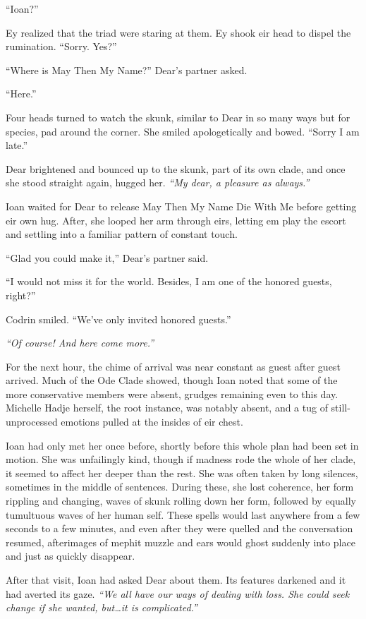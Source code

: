 ``Ioan?''

Ey realized that the triad were staring at them. Ey shook eir head to dispel the rumination. ``Sorry. Yes?''

``Where is May Then My Name?'' Dear's partner asked.

``Here.''

Four heads turned to watch the skunk, similar to Dear in so many ways but for species, pad around the corner. She smiled apologetically and bowed. ``Sorry I am late.''

Dear brightened and bounced up to the skunk, part of its own clade, and once she stood straight again, hugged her. \emph{``My dear, a pleasure as always.''}

Ioan waited for Dear to release May Then My Name Die With Me before getting eir own hug. After, she looped her arm through eirs, letting em play the escort and settling into a familiar pattern of constant touch.

``Glad you could make it,'' Dear's partner said.

``I would not miss it for the world. Besides, I am one of the honored guests, right?''

Codrin smiled. ``We've only invited honored guests.''

\emph{``Of course! And here come more.''}

For the next hour, the chime of arrival was near constant as guest after guest arrived. Much of the Ode Clade showed, though Ioan noted that some of the more conservative members were absent, grudges remaining even to this day. Michelle Hadje herself, the root instance, was notably absent, and a tug of still-unprocessed emotions pulled at the insides of eir chest.

Ioan had only met her once before, shortly before this whole plan had been set in motion. She was unfailingly kind, though if madness rode the whole of her clade, it seemed to affect her deeper than the rest. She was often taken by long silences, sometimes in the middle of sentences. During these, she lost coherence, her form rippling and changing, waves of skunk rolling down her form, followed by equally tumultuous waves of her human self. These spells would last anywhere from a few seconds to a few minutes, and even after they were quelled and the conversation resumed, afterimages of mephit muzzle and ears would ghost suddenly into place and just as quickly disappear.

After that visit, Ioan had asked Dear about them. Its features darkened and it had averted its gaze. \emph{``We all have our ways of dealing with loss. She could seek change if she wanted, but\ldots it is complicated.''}

